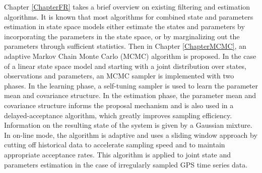 Chapter \ref{ChapterFR} takes a brief overview on existing filtering and estimation algorithms. It is known that most algorithms for combined state and parameters estimation in state space models either estimate the states and parameters by incorporating the parameters in the state space, or by marginalizing out the parameters through sufficient statistics. Then in Chapter \ref{ChapterMCMC}, an adaptive Markov Chain Monte Carlo (MCMC) algorithm is proposed. In the case of a linear state space model and starting with a joint distribution over states, observations and parameters, an MCMC sampler is implemented with two phases. In the learning phase, a self-tuning sampler is used to learn the parameter mean and covariance structure. In the estimation phase, the parameter mean and covariance structure informs the proposal mechanism and is also used in a delayed-acceptance algorithm, which greatly improves sampling efficiency. Information on the resulting state of the system is given by a Gaussian mixture. In on-line mode, the algorithm is adaptive and uses a sliding window approach by cutting off historical data to accelerate sampling speed and to maintain appropriate acceptance rates. This algorithm is applied to joint state and parameters estimation in the case of irregularly sampled GPS time series data. 





